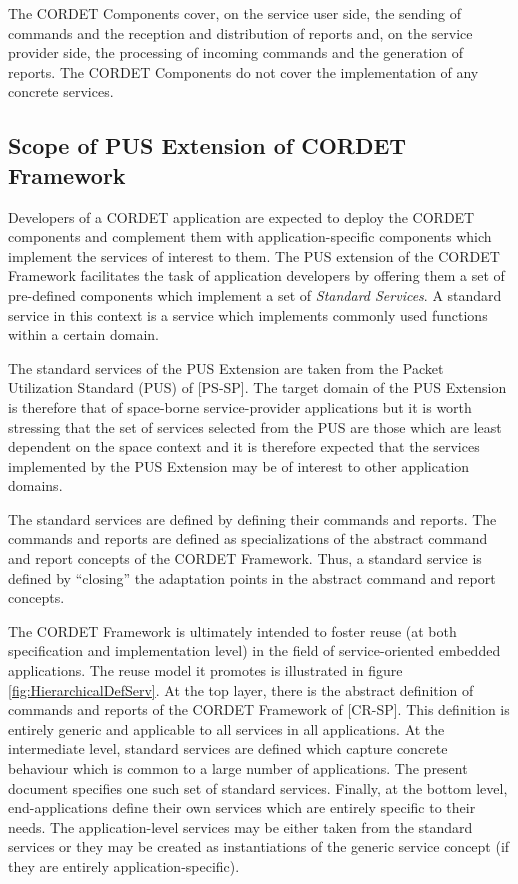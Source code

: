 \documentclass{pnp_article}
\begin{document}
The CORDET Components cover, on the service user side, the sending of commands and the reception and distribution of reports and, on the service provider side, the processing of incoming commands and the generation of reports. The CORDET Components do not cover the implementation of any concrete services. 

\subsection{Scope of PUS Extension of CORDET Framework}\label{sec:ScopePusExt}
Developers of a CORDET application are expected to deploy the CORDET components and complement them with application-specific components which implement the services of interest to them. The PUS extension of the CORDET Framework facilitates the task of application developers by offering them a set of pre-defined components which implement a set of \textit{Standard Services}. A standard service in this context is a service which implements commonly used functions within a certain domain. 

The standard services of the PUS Extension are taken from the Packet Utilization Standard (PUS) of [PS-SP]. The target domain of the PUS Extension is therefore that of space-borne service-provider applications but it is worth stressing that the set of services selected from the PUS are those which are least dependent on the space context and it is therefore expected that the services implemented by the PUS Extension may be of interest to other application domains.

The standard services are defined by defining their commands and reports. The commands and reports are defined as specializations of the abstract command and report concepts of the CORDET Framework. Thus, a standard service is defined by “closing” the adaptation points in the abstract command and report concepts.

The CORDET Framework is ultimately intended to foster reuse (at both specification and implementation level) in the field of service-oriented embedded applications. The reuse model it promotes is illustrated in figure \ref{fig:HierarchicalDefServ}. At the top layer, there is the abstract definition of commands and reports of the CORDET Framework of [CR-SP]. This definition is entirely generic and applicable to all services in all applications. At the intermediate level, standard services are defined which capture concrete behaviour which is common to a large number of applications. The present document specifies one such set of standard services. Finally, at the bottom level, end-applications define their own services which are entirely specific to their needs. The application-level services may be either taken from the standard services or they may be created as instantiations of the generic service concept (if they are entirely application-specific).
\end{document}
